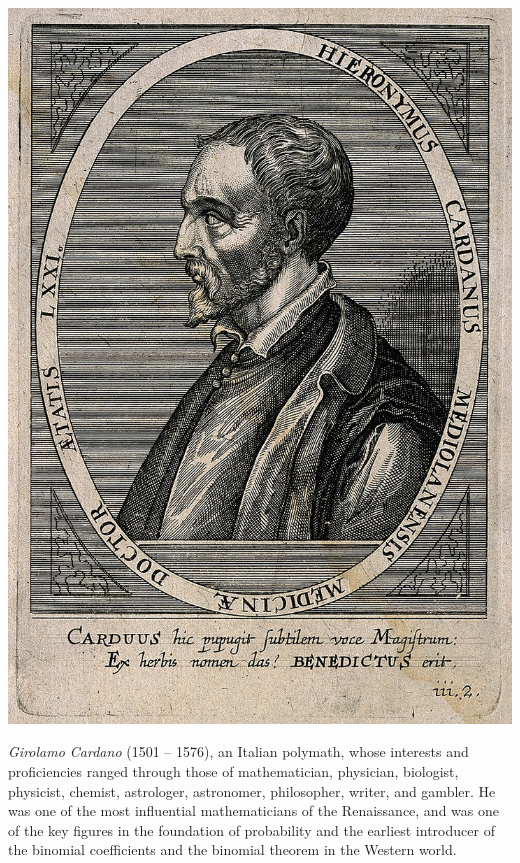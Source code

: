 \documentclass[9pt]{beamer}
\begin{document}
\begin{frame}[fragile] %
 \begin{center}
   \includegraphics[scale=0.15]{./figs/Girolamo_Cardano.jpg}
   \bigskip

   {\it Girolamo Cardano} (1501 -- 1576),  an Italian polymath, whose interests and proficiencies ranged
   through those of mathematician, physician, biologist, physicist, chemist, astrologer, astronomer,
   philosopher, writer, and gambler. He was one of the most influential mathematicians of the
   Renaissance, and was one of the key figures in the foundation of probability and the earliest
   introducer of the binomial coefficients and the binomial theorem in the Western world.
 \end{center}
\end{frame}
\end{document}
